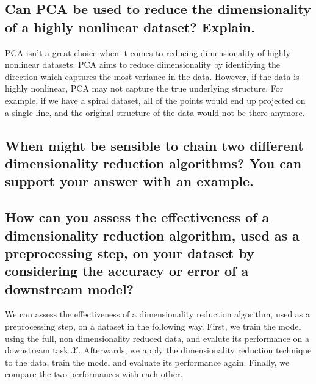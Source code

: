 \documentclass{article}
\begin{document}
\subsection{Can PCA be used to reduce the dimensionality of a highly nonlinear dataset? Explain.}
PCA isn't a great choice when it comes to reducing dimensionality of highly nonlinear datasets. PCA aims to reduce dimensionality by identifying the direction which captures the most variance in the data. However, if the data is highly nonlinear, PCA may not capture the true underlying structure. For example, if we have a spiral dataset, all of the points would end up projected on a single line, and the original structure of the data would not be there anymore.

\subsection{When might be sensible to chain two different dimensionality reduction algorithms? You can support your answer with an example.}



\subsection{How can you assess the effectiveness of a dimensionality reduction algorithm, used as a preprocessing step, on your dataset by considering the accuracy or error of a downstream model?}

We can assess the effectiveness of a dimensionality reduction algorithm, used as a preprocessing step, on a dataset in the following way. First, we train the model using the full, non dimensionality reduced data, and evalute its performance on a downstream task $\mathcal{X}$. Afterwards, we apply the dimensionality reduction technique to the data, train the model and evaluate its performance again. Finally, we compare the two performances with each other.

\clearpage

% 
% 

\end{document}
